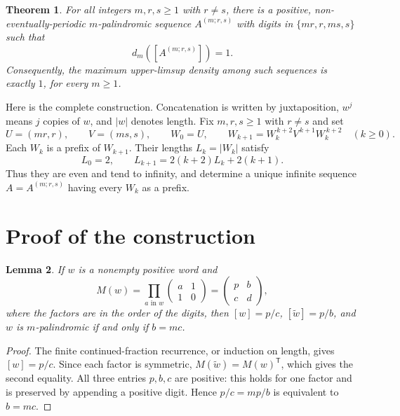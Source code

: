 \documentclass[11pt]{article}
\newtheorem{theorem}{Theorem}
\newtheorem{lemma}[theorem]{Lemma}
\begin{document}
\begin{theorem}\label{thm:main}
For all integers $m,r,s\geq1$ with $r\ne s$, there is a positive,
non-eventually-periodic $m$-palindromic sequence $A^{(m;r,s)}$ with digits in
$\{mr,r,ms,s\}$ such that
\[
 d_m([A^{(m;r,s)}])=1.
\]
Consequently, the maximum upper-limsup density among such sequences is
exactly $1$, for every $m\geq1$.
\end{theorem}

Here is the complete construction. Concatenation is written by juxtaposition,
$w^j$ means $j$ copies of $w$, and $|w|$ denotes length. Fix $m,r,s\geq1$
with $r\ne s$ and set
\begin{equation}\label{eq:construction}
 U=(mr,r),\qquad V=(ms,s),\qquad W_0=U,\qquad
 W_{k+1}=W_k^{\,k+2}V^{\,k+1}W_k^{\,k+2}\quad(k\geq0).
\end{equation}
Each $W_k$ is a prefix of $W_{k+1}$. Their lengths $L_k=|W_k|$ satisfy
\begin{equation}\label{eq:length}
 L_0=2,\qquad L_{k+1}=2(k+2)L_k+2(k+1).
\end{equation}
Thus they are even and tend to infinity, and determine a unique infinite
sequence $A=A^{(m;r,s)}$ having every $W_k$ as a prefix.

\section{Proof of the construction}
\begin{lemma}\label{lem:matrix}
If $w$ is a nonempty positive word and
\[
 M(w)=\prod_{a\text{ in }w}\begin{pmatrix}a&1\\1&0\end{pmatrix}
     =\begin{pmatrix}p&b\\c&d\end{pmatrix},
\]
where the factors are in the order of the digits, then
$[w]=p/c$, $[\widetilde w]=p/b$, and $w$ is $m$-palindromic if and only if
$b=mc$.
\end{lemma}
\begin{proof}
The finite continued-fraction recurrence, or induction on length, gives
$[w]=p/c$. Since each factor is symmetric, $M(\widetilde w)=M(w)^{\mathsf T}$,
which gives the second equality. All three entries $p,b,c$ are positive:
this holds for one factor and is preserved by appending a positive digit.
Hence $p/c=mp/b$ is equivalent to $b=mc$.
\end{proof}
\end{document}
